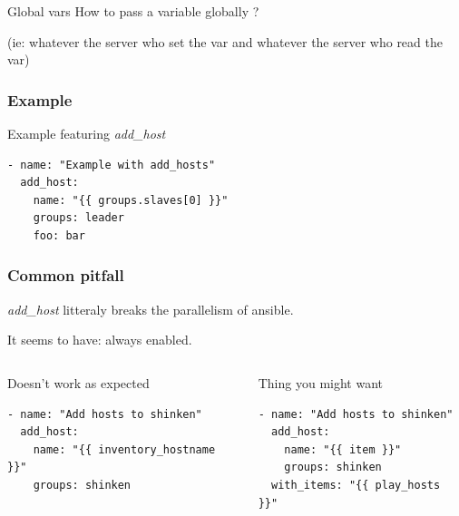 \documentclass{beamer}
\begin{document}

\begin{frame}[fragile]
\begin{block}{Global vars}
How to pass a variable globally ?

(ie: whatever the server who set the var and whatever the server who read the var)
\end{block}

\end{frame}

\begin{frame}[fragile]
\frametitle{Example}
    \begin{exampleblock}{Example featuring \textit{add\_host}}
        \begin{verbatim}
- name: "Example with add_hosts"
  add_host:
    name: "{{ groups.slaves[0] }}"
    groups: leader
    foo: bar
        \end{verbatim}
    \end{exampleblock}
\end{frame}

\begin{frame}[fragile]
\frametitle{Common pitfall}
    \textit{add\_host} litteraly breaks the parallelism of ansible.

    It seems to have:  always enabled.
    \begin{columns}
        \begin{alertblock}{Doesn't work as expected}
            \footnotesize{
            \begin{verbatim}
- name: "Add hosts to shinken"
  add_host:
    name: "{{ inventory_hostname }}"
    groups: shinken
            \end{verbatim}
            }
        \end{alertblock}
        \begin{minipage}{\textwidth}
        \begin{exampleblock}{Thing you might want}
            \footnotesize{
            \begin{verbatim}
- name: "Add hosts to shinken"
  add_host:
    name: "{{ item }}"
    groups: shinken
  with_items: "{{ play_hosts }}"
            \end{verbatim}
            }
        \end{exampleblock}
        \end{minipage}
    \end{columns}
\end{frame}
\end{document}
